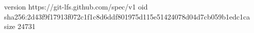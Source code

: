 version https://git-lfs.github.com/spec/v1
oid sha256:2d43f9f17913f072c1f1c8d6ddf801975d115e51424078d04d7cb059b1edc1ca
size 24731
